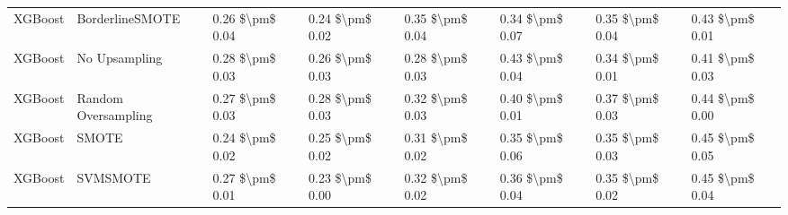 \begin{tabular}{llllllll}
                        XGBoost &               BorderlineSMOTE & 0.26 \$\textbackslash pm\$ 0.04 &           0.24 \$\textbackslash pm\$ 0.02 &       0.35 \$\textbackslash pm\$ 0.04 &        0.34 \$\textbackslash pm\$ 0.07 &                         0.35 \$\textbackslash pm\$ 0.04 &     0.43 \$\textbackslash pm\$ 0.01 \\
                        XGBoost &                 No Upsampling & 0.28 \$\textbackslash pm\$ 0.03 &           0.26 \$\textbackslash pm\$ 0.03 &       0.28 \$\textbackslash pm\$ 0.03 &        0.43 \$\textbackslash pm\$ 0.04 &                         0.34 \$\textbackslash pm\$ 0.01 &     0.41 \$\textbackslash pm\$ 0.03 \\
                        XGBoost &           Random Oversampling & 0.27 \$\textbackslash pm\$ 0.03 &           0.28 \$\textbackslash pm\$ 0.03 &       0.32 \$\textbackslash pm\$ 0.03 &        0.40 \$\textbackslash pm\$ 0.01 &                         0.37 \$\textbackslash pm\$ 0.03 &     0.44 \$\textbackslash pm\$ 0.00 \\
                        XGBoost &                         SMOTE & 0.24 \$\textbackslash pm\$ 0.02 &           0.25 \$\textbackslash pm\$ 0.02 &       0.31 \$\textbackslash pm\$ 0.02 &        0.35 \$\textbackslash pm\$ 0.06 &                         0.35 \$\textbackslash pm\$ 0.03 &     0.45 \$\textbackslash pm\$ 0.05 \\
                        XGBoost &                      SVMSMOTE & 0.27 \$\textbackslash pm\$ 0.01 &           0.23 \$\textbackslash pm\$ 0.00 &       0.32 \$\textbackslash pm\$ 0.02 &        0.36 \$\textbackslash pm\$ 0.04 &                         0.35 \$\textbackslash pm\$ 0.02 &     0.45 \$\textbackslash pm\$ 0.04 \\
\bottomrule
\end{tabular}
